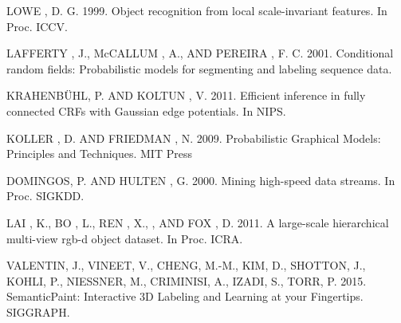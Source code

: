 \documentclass{llncs}
\begin{document}
\begin{thebibliography}{1}
  LOWE , D. G. 1999. Object recognition from local scale-invariant features. In Proc. ICCV.
  
  LAFFERTY , J., McCALLUM , A., AND PEREIRA , F. C. 2001. Conditional random fields: Probabilistic models for segmenting and labeling sequence data.
  
  KRAHENBÜHL, P. AND KOLTUN , V. 2011. Efficient inference in fully connected CRFs with Gaussian edge potentials. In NIPS.

  KOLLER , D. AND FRIEDMAN , N. 2009. Probabilistic Graphical Models: Principles and Techniques. MIT Press
  
  DOMINGOS, P. AND HULTEN , G. 2000. Mining high-speed data streams. In Proc. SIGKDD.
	
  LAI , K., BO , L., REN , X., , AND FOX , D. 2011. A large-scale hierarchical multi-view rgb-d object dataset. In Proc. ICRA.
  
  VALENTIN, J., VINEET, V., CHENG, M.-M., KIM, D., SHOTTON, J., KOHLI, P., NIESSNER, M., CRIMINISI, A., IZADI, S., TORR, P. 2015. SemanticPaint: Interactive 3D Labeling and Learning at your Fingertips. SIGGRAPH.

\end{thebibliography}
\end{document}
